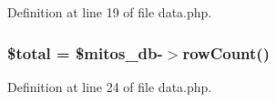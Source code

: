 \-Definition at line 19 of file data.\-php.

\hypertarget{administration_2log_2data_8php_a241b818f48030b628685b2e5119c5624}{
\subsubsection[{\$total}]{\setlength{\rightskip}{0pt plus 5cm}\$total = \$mitos\-\_\-db-\/$>$row\-Count()}}\label{administration_2log_2data_8php_a241b818f48030b628685b2e5119c5624}


\-Definition at line 24 of file data.\-php.

